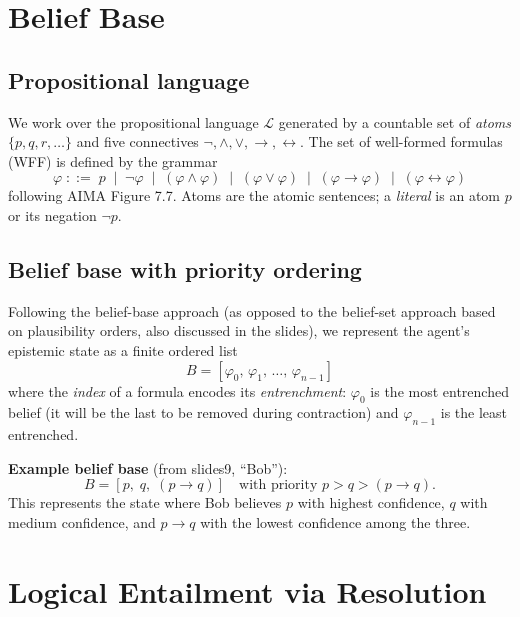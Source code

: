 \documentclass[11pt,a4paper]{article}
\newcommand{\lneg}{\neg}
\begin{document}
\section{Belief Base}

\subsection{Propositional language}

We work over the propositional language $\mathcal{L}$ generated by a countable
set of \emph{atoms} $\{p, q, r, \ldots\}$ and five connectives
$\lneg, \land, \lor, \to, \leftrightarrow$.
The set of well-formed formulas (WFF) is defined by the grammar
\[
  \varphi \;::=\; p \;\mid\; \lneg\varphi \;\mid\; (\varphi \land \varphi) \;\mid\;
  (\varphi \lor \varphi) \;\mid\; (\varphi \to \varphi) \;\mid\;
  (\varphi \leftrightarrow \varphi)
\]
following AIMA Figure 7.7.
Atoms are the atomic sentences; a \emph{literal} is an atom $p$ or its negation $\lneg p$.

\subsection{Belief base with priority ordering}

Following the belief-base approach (as opposed to the belief-set approach based on
plausibility orders, also discussed in the slides), we represent the agent's epistemic
state as a finite ordered list
\[
  B = [\varphi_0,\, \varphi_1,\, \ldots,\, \varphi_{n-1}]
\]
where the \emph{index} of a formula encodes its \emph{entrenchment}: $\varphi_0$ is
the most entrenched belief (it will be the last to be removed during contraction) and
$\varphi_{n-1}$ is the least entrenched.

\textbf{Example belief base} (from slides9, ``Bob''):
\[
  B = [p,\; q,\; (p \to q)]
  \quad \text{with priority } p > q > (p \to q).
\]
This represents the state where Bob believes $p$ with highest confidence,
$q$ with medium confidence, and $p \to q$ with the lowest confidence among the three.

\section{Logical Entailment via Resolution}
\end{document}
